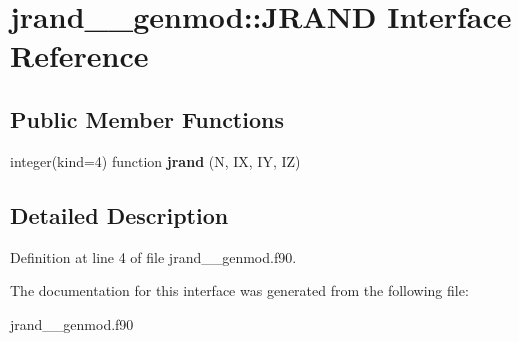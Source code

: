 \hypertarget{interfacejrand____genmod_1_1_j_r_a_n_d}{\section{jrand\+\_\+\+\_\+genmod\+:\+:J\+R\+A\+N\+D Interface Reference}
\label{interfacejrand____genmod_1_1_j_r_a_n_d}
}
\subsection*{Public Member Functions}
\begin{DoxyCompactItemize}
\item 
\hypertarget{interfacejrand____genmod_1_1_j_r_a_n_d_a67c31515bc590172786e1df24c8875a6}{integer(kind=4) function {\bfseries jrand} (N, I\+X, I\+Y, I\+Z)}\label{interfacejrand____genmod_1_1_j_r_a_n_d_a67c31515bc590172786e1df24c8875a6}

\end{DoxyCompactItemize}


\subsection{Detailed Description}


Definition at line 4 of file jrand\+\_\+\+\_\+genmod.\+f90.



The documentation for this interface was generated from the following file\+:\begin{DoxyCompactItemize}
\item 
jrand\+\_\+\+\_\+genmod.\+f90\end{DoxyCompactItemize}
